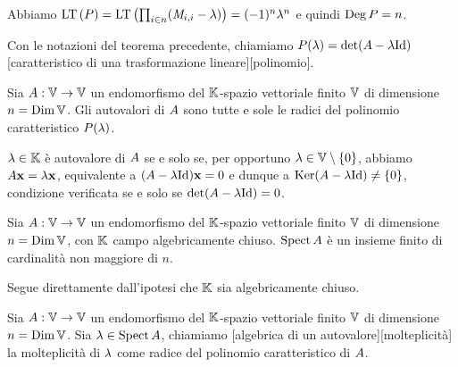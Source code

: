 \par Abbiamo $\text{LT} \left ( P \right ) = \text{LT} \left ( \prod_{i \in n} (\mathit{M}_{i,i} - \lambda) \right ) = (- 1)^n \lambda^n$ e quindi $\operatorname{\operatorname{Deg}}{P} = n$. \EndProof
\begin{Definition}
	Con le notazioni del teorema precedente, chiamiamo $\CharacteristicPolynomial(\lambda) = \Determinant(\LinearTransformation - \lambda \Identity)$ [caratteristico di una trasformazione lineare][polinomio].
\end{Definition}
\begin{Theorem}
	Sia $A: \mathbb{V} \rightarrow \mathbb{V}$ un endomorfismo del $\mathbb{K}$-spazio vettoriale finito $\mathbb{V}$ di dimensione $n = \operatorname{\operatorname{Dim}}{\mathbb{V}}$.
	Gli autovalori di $A$ sono tutte e sole le radici del polinomio caratteristico $P(\lambda)$.
\end{Theorem}
\Proof $\lambda \in \mathbb{K}$ \`e autovalore di $A$ se e solo se, per opportuno $\lambda \in \mathbb{V} \setminus \lbrace 0 \rbrace$, abbiamo $\LinearTransformation \Eigenvector = \lambda \Eigenvector$, equivalente a $(\LinearTransformation - \lambda \Identity) \Eigenvector = 0$ e dunque a $\Kernel(\LinearTransformation - \lambda \Identity) \neq \lbrace 0 \rbrace$, condizione verificata se e solo se $\Determinant(\LinearTransformation - \lambda \Identity) = 0$. \EndProof
\begin{Corollary}
	Sia
  $A: \mathbb{V} \rightarrow \mathbb{V}$
  un endomorfismo del $\mathbb{K}$-spazio vettoriale finito $\mathbb{V}$ di
  dimensione $n = \operatorname{\operatorname{Dim}}{\mathbb{V}}$, con $\mathbb{K}$ campo algebricamente
  chiuso.
  $\operatorname{Spect}{A}$ \`e un insieme finito di cardinalit\`a non
  maggiore di $n$.
\end{Corollary}
\Proof Segue direttamente dall'ipotesi che $\mathbb{K}$ sia algebricamente chiuso.
\EndProof
\begin{Definition}
	Sia $A: \mathbb{V} \rightarrow \mathbb{V}$ un
  endomorfismo del $\mathbb{K}$-spazio vettoriale finito $\mathbb{V}$ di
  dimensione $n = \operatorname{\operatorname{Dim}}{\mathbb{V}}$.
	Sia $\lambda \in \operatorname{Spect}{A}$, chiamiamo
  [algebrica di un autovalore][molteplicit\`a]
  la molteplicit\`a di $\lambda$ come radice del polinomio caratteristico di
  $A$.
\end{Definition}
